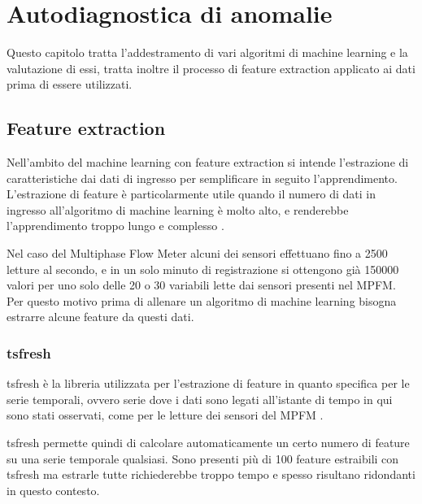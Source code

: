 \chapter{Autodiagnostica di anomalie}
\label{AutodiagnosticaDiAnomalie}

Questo capitolo tratta l'addestramento di vari algoritmi di machine learning e la valutazione di essi, tratta inoltre il processo di feature extraction applicato ai dati prima di essere utilizzati.

\section{Feature extraction}
Nell'ambito del machine learning con feature extraction si intende l'estrazione di caratteristiche dai dati di ingresso per semplificare in seguito l'apprendimento.
L'estrazione di feature è particolarmente utile quando il numero di dati in ingresso all'algoritmo di machine learning è molto alto, e renderebbe l'apprendimento troppo lungo e complesso \cite{FeatureExtraction}.

Nel caso del Multiphase Flow Meter alcuni dei sensori effettuano fino a 2500 letture al secondo, e in un solo minuto di registrazione si ottengono già 150000 valori per uno solo delle 20 o 30 variabili lette dai sensori presenti nel MPFM.
Per questo motivo prima di allenare un algoritmo di machine learning bisogna estrarre alcune feature da questi dati.

\subsection{tsfresh}
tsfresh è la libreria utilizzata per l'estrazione di feature in quanto specifica per le serie temporali, ovvero serie dove i dati sono legati all'istante di tempo in qui sono stati osservati, come per le letture dei sensori del MPFM \cite{tsfresh}.

tsfresh permette quindi di calcolare automaticamente un certo numero di feature su una serie temporale qualsiasi. Sono presenti più di 100 feature estraibili con tsfresh ma estrarle tutte richiederebbe troppo tempo e spesso risultano ridondanti in questo contesto.

